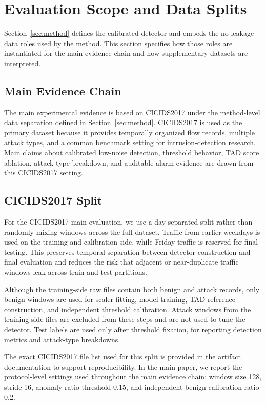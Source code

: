 \section{Evaluation Scope and Data Splits}
\label{sec:protocol}

Section~\ref{sec:method} defines the calibrated detector and embeds the no-leakage data roles used by the method. This section specifies how those roles are instantiated for the main evidence chain and how supplementary datasets are interpreted.

\subsection{Main Evidence Chain}

The main experimental evidence is based on CICIDS2017 under the method-level data separation defined in Section~\ref{sec:method}. CICIDS2017 is used as the primary dataset because it provides temporally organized flow records, multiple attack types, and a common benchmark setting for intrusion-detection research. Main claims about calibrated low-noise detection, threshold behavior, TAD score ablation, attack-type breakdown, and auditable alarm evidence are drawn from this CICIDS2017 setting.

\subsection{CICIDS2017 Split}
\label{sec:cicids_split}

For the CICIDS2017 main evaluation, we use a day-separated split rather than randomly mixing windows across the full dataset. Traffic from earlier weekdays is used on the training and calibration side, while Friday traffic is reserved for final testing. This preserves temporal separation between detector construction and final evaluation and reduces the risk that adjacent or near-duplicate traffic windows leak across train and test partitions.

Although the training-side raw files contain both benign and attack records, only benign windows are used for scaler fitting, model training, TAD reference construction, and independent threshold calibration. Attack windows from the training-side files are excluded from these steps and are not used to tune the detector. Test labels are used only after threshold fixation, for reporting detection metrics and attack-type breakdowns.

The exact CICIDS2017 file list used for this split is provided in the artifact documentation to support reproducibility. In the main paper, we report the protocol-level settings used throughout the main evidence chain: window size 128, stride 16, anomaly-ratio threshold 0.15, and independent benign calibration ratio 0.2.

